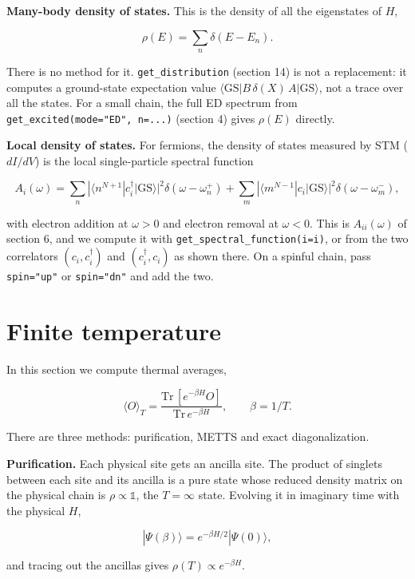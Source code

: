 \documentclass[11pt]{article}
\begin{document}
\textbf{Many-body density of states.} This is the density of all the
eigenstates of \(H\),

\[\rho(E)=\sum_n\delta(E-E_n).\]

There is no method for it. \texttt{get\_\allowbreak{}distribution} (section 14) is not a
replacement: it computes a ground-state expectation value
\(\langle\mathrm{GS}|B\,\delta(X)\,A|\mathrm{GS}\rangle\), not a trace over
all the states. For a small chain, the full ED spectrum from
\texttt{get\_\allowbreak{}excited(mode="ED",\ n=.\allowbreak{}.\allowbreak{}.\allowbreak{})} (section 4) gives \(\rho(E)\) directly.

\textbf{Local density of states.} For fermions, the density of states measured
by STM (\(dI/dV\)) is the local single-particle spectral function

\[A_i(\omega)=\sum_n|\langle n^{N+1}|c_i^\dagger|\mathrm{GS}\rangle|^2\delta(\omega-\omega_n^+)
+\sum_m|\langle m^{N-1}|c_i|\mathrm{GS}\rangle|^2\delta(\omega-\omega_m^-),\]

with electron addition at \(\omega>0\) and electron removal at \(\omega<0\).
This is \(A_{ii}(\omega)\) of section 6, and we compute it with
\texttt{get\_\allowbreak{}spectral\_\allowbreak{}function(i=i)}, or from the two correlators
\((c_i,c_i^\dagger)\) and \((c_i^\dagger,c_i)\) as shown there. On a spinful
chain, pass \texttt{spin="up"} or \texttt{spin="dn"} and add the two.

\section{Finite temperature}

In this section we compute thermal averages,

\[\langle O\rangle_T=\frac{\mathrm{Tr}\,[e^{-\beta H}O]}{\mathrm{Tr}\,e^{-\beta H}},
\qquad\beta=1/T.\]

There are three methods: purification, METTS and exact diagonalization.

\textbf{Purification.} Each physical site gets an ancilla site. The product of
singlets between each site and its ancilla is a pure state whose reduced
density matrix on the physical chain is \(\rho\propto\mathbb 1\), the
\(T=\infty\) state. Evolving it in imaginary time with the physical \(H\),

\[|\Psi(\beta)\rangle=e^{-\beta H/2}|\Psi(0)\rangle,\]

and tracing out the ancillas gives \(\rho(T)\propto e^{-\beta H}\).
\end{document}
